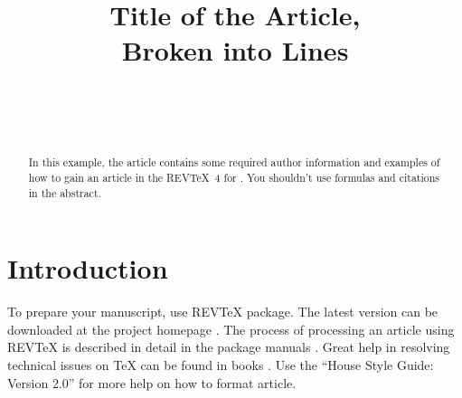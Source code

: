 \documentclass[
11pt,%
tightenlines,%
twoside,%
onecolumn,%
nofloats,%
nobibnotes,%
nofootinbib,%
superscriptaddress,%
noshowpacs,%
centertags]%
{revtex4}
\begin{document}

\title{Title of the Article,\\
Broken into Lines}

\author{~}


\author{~}




\begin{abstract} %
In this example, the article contains some required author
information and examples of how to gain an article in the REV\TeX~4
for \ljm. You shouldn't use formulas and citations in the abstract.
\end{abstract}



\maketitle


\section{Introduction}

To prepare your manuscript, use REV\TeX{} package. The latest version can be downloaded at the project homepage \cite{RTeXHome}.
The process of processing an article using REV\TeX{} is described in detail in the package manuals \cite{RTeX}. Great help in resolving technical
issues on \TeX{} can be found in books \cite{texbook,L,GG,KD}.
Use the ``House Style Guide: Version 2.0'' \cite{hsg} for more help on how to format article.
\end{document}

